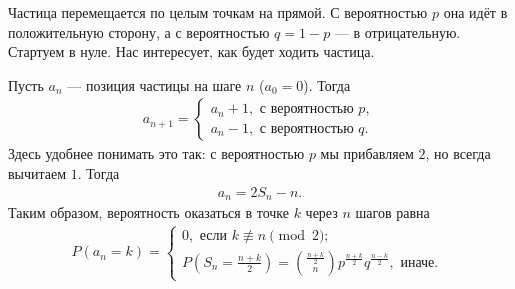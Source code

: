 \documentclass[../main.tex]{subfiles}
\begin{document}
\begin{exmpl}
 Частица перемещается по целым точкам на прямой. С вероятностью $p$ она идёт в положительную сторону, а с вероятностью $q = 1 - p$ --- в отрицательную. Стартуем в нуле. Нас интересует, как будет ходить частица.

 Пусть $a_n$ --- позиция частицы на шаге $n$ ($a_0 = 0$). Тогда
 \begin{align*}
  a_{n+1} = \begin{cases}
   a_n + 1, \text{ с вероятностью } p,  \\
   a_n - 1, \text{ с вероятностью } q.
  \end{cases}
 \end{align*} Здесь удобнее понимать это так: с вероятностью $p$ мы прибавляем $2$, но всегда вычитаем $1$. Тогда
 \begin{align*}
  a_n = 2S_n - n.
 \end{align*} Таким образом, вероятность оказаться в точке $k$ через $n$ шагов равна
 \begin{align*}
  P(a_n = k) = \begin{cases}
   0, \text{ если } k \not \equiv n \pmod 2;  \\
   P(S_n = \frac{n+k}{2}) = \binom {\frac{n+k}{2}} n p^{\frac{n+k}{2}} q^{\frac{n-k}{2}}, \text{ иначе. }
  \end{cases} 
 \end{align*} 
\end{exmpl}
\end{document}
